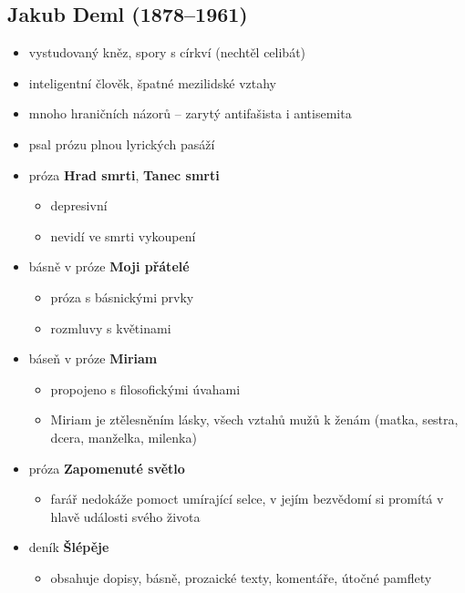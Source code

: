 \subsection{Jakub Deml (1878--1961)}
\begin{itemize}
\item vystudovaný kněz, spory s církví (nechtěl celibát)
\item inteligentní člověk, špatné mezilidské vztahy
\item mnoho hraničních názorů -- zarytý antifašista i antisemita
\item psal prózu plnou lyrických pasáží
	\item próza \textbf{Hrad smrti}, \textbf{Tanec smrti}
		\begin{itemize}
		\item depresivní
		\item nevidí ve smrti vykoupení
		\end{itemize}
	\item básně v próze \textbf{Moji přátelé}
		\begin{itemize}
		\item próza s básnickými prvky
		\item rozmluvy s květinami
		\end{itemize}
	\item báseň v próze \textbf{Miriam}
		\begin{itemize}
		\item propojeno s filosofickými úvahami
		\item Miriam je ztělesněním lásky, všech vztahů mužů k ženám (matka, sestra, dcera, manželka, milenka)
		\end{itemize}
	\item próza \textbf{Zapomenuté světlo}
		\begin{itemize}
		\item farář nedokáže pomoct umírající selce, v jejím bezvědomí si promítá v hlavě události svého života
		\end{itemize}
	\item deník \textbf{Šlépěje}
		\begin{itemize}
		\item obsahuje dopisy, básně, prozaické texty, komentáře, útočné pamflety 
		\end{itemize}
\end{itemize}

